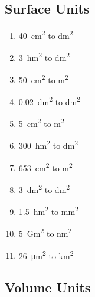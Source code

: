 \subsection{Surface Units}
\begin{exercise}
    \phantom{a}
    \begin{enumerate}[label=\letraminuscula]
        \item \qty{40}{\square\centi\m} to \unit{\square\deci\m}
        \item \qty{3}{\square\hecto\m} to \unit{\square\deci\m}
        \item \qty{50}{\square\centi\m} to \unit{\square\m}
        \item \qty{0.02}{\square\deci\m} to \unit{\square\deca\m}
        \item \qty{5}{\square\centi\m} to \unit{\square\m}
        \item \qty{300}{\square\hecto\m} to \unit{\square\deci\m}
        \item \qty{653}{\square\centi\m} to \unit{\square\m}
        \item \qty{3}{\square\deci\m} to \unit{\square\deca\m}
        \item \qty{1.5}{\square\hecto\m} to \unit{\square\milli\m}
        \item  \qty{5}{\square\giga\m} to \unit{\square\nano\m}
        \item \qty{26}{\square\micro\m} to \unit{\square\kilo\m}
    \end{enumerate}
\end{exercise}

\subsection{Volume Units}

